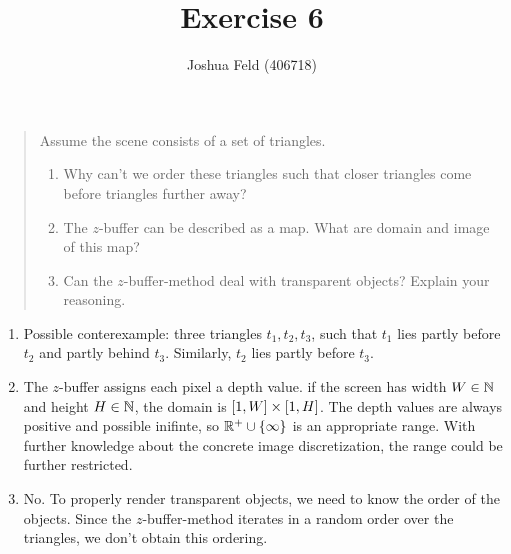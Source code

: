 \documentclass[english]{exercise}
\title{Exercise 6}
\author{Joshua Feld (406718)}
\begin{document}
	\maketitle


	\section{}

	\begin{quote}
		Assume the scene consists of a set of triangles.
		\begin{enumerate}
			\item Why can't we order these triangles such that closer triangles come before triangles further away?
			\item The \(z\)-buffer can be described as a map. What are domain and image of this map?
			\item Can the \(z\)-buffer-method deal with transparent objects? Explain your reasoning.
		\end{enumerate}
	\end{quote}

	\begin{enumerate}
		\item Possible conterexample: three triangles \(t_1, t_2, t_3\), such that \(t_1\) lies partly before \(t_2\) and partly behind \(t_3\).
		Similarly, \(t_2\) lies partly before \(t_3\).
		\item The \(z\)-buffer assigns each pixel a depth value.
		if the screen has width \(W \in \N\) and height \(H \in \N\), the domain is \(\brackets*{1, W} \times \brackets*{1, H}\).
		The depth values are always positive and possible inifinte, so \(\R^+ \cup \braces*{\infty}\) is an appropriate range.
		With further knowledge about the concrete image discretization, the range could be further restricted.
		\item No.
		To properly render transparent objects, we need to know the order of the objects.
		Since the \(z\)-buffer-method iterates in a random order over the triangles, we don't obtain this ordering.
	\end{enumerate}


	\section{}
\end{document}
